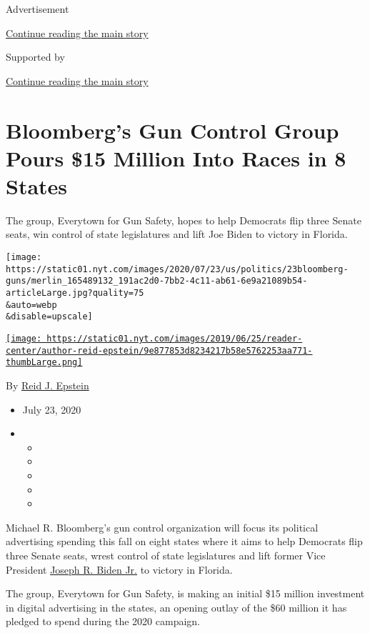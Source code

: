 Advertisement

\protect\hyperlink{after-top}{Continue reading the main story}

Supported by

\protect\hyperlink{after-sponsor}{Continue reading the main story}

\hypertarget{bloombergs-gun-control-group-pours-15-million-into-races-in-8-states}{%
\section{Bloomberg's Gun Control Group Pours \$15 Million Into Races in
8
States}\label{bloombergs-gun-control-group-pours-15-million-into-races-in-8-states}}

The group, Everytown for Gun Safety, hopes to help Democrats flip three
Senate seats, win control of state legislatures and lift Joe Biden to
victory in Florida.

\texttt{[image: https://static01.nyt.com/images/2020/07/23/us/politics/23bloomberg-guns/merlin\_165489132\_191ac2d0-7bb2-4c11-ab61-6e9a21089b54-articleLarge.jpg?quality=75\\\&auto=webp\\\&disable=upscale]}

\href{https://www.nytimes.com/by/reid-j-epstein}{\texttt{[image: https://static01.nyt.com/images/2019/06/25/reader-center/author-reid-epstein/9e877853d8234217b58e5762253aa771-thumbLarge.png]}}

By \href{https://www.nytimes.com/by/reid-j-epstein}{Reid J. Epstein}

\begin{itemize}
\item
  July 23, 2020
\item
  \begin{itemize}
  \item
  \item
  \item
  \item
  \item
  \end{itemize}
\end{itemize}

Michael R. Bloomberg's gun control organization will focus its political
advertising spending this fall on eight states where it aims to help
Democrats flip three Senate seats, wrest control of state legislatures
and lift former Vice President
\href{https://www.nytimes.com/interactive/2020/us/elections/joe-biden.html}{Joseph
R. Biden Jr.} to victory in Florida.

The group, Everytown for Gun Safety, is making an initial \$15 million
investment in digital advertising in the states, an opening outlay of
the \$60 million it has pledged to spend during the 2020 campaign.

